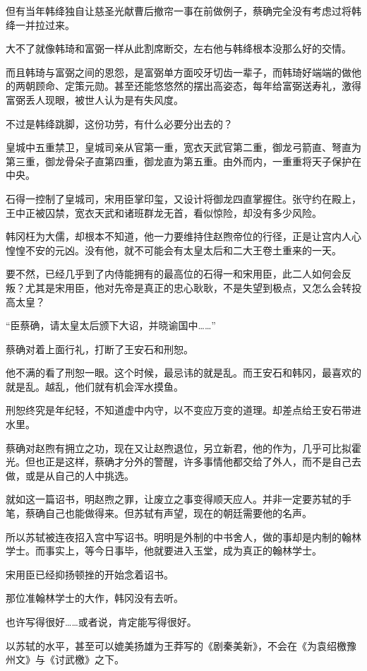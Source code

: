 但有当年韩绛独自让慈圣光献曹后撤帘一事在前做例子，蔡确完全没有考虑过将韩绛一并拉过来。

大不了就像韩琦和富弼一样从此割席断交，左右他与韩绛根本没那么好的交情。

而且韩琦与富弼之间的恩怨，是富弼单方面咬牙切齿一辈子，而韩琦好端端的做他的两朝顾命、定策元勋。甚至还能悠悠然的摆出高姿态，每年给富弼送寿礼，激得富弼丢人现眼，被世人认为是有失风度。

不过是韩绛跳脚，这份功劳，有什么必要分出去的？

皇城中五重禁卫，皇城司亲从官第一重，宽衣天武官第二重，御龙弓箭直、弩直为第三重，御龙骨朵子直第四重，御龙直为第五重。由外而内，一重重将天子保护在中央。

石得一控制了皇城司，宋用臣掌印玺，又设计将御龙四直掌握住。张守约在殿上，王中正被囚禁，宽衣天武和诸班群龙无首，看似惊险，却没有多少风险。

韩冈枉为大儒，却根本不知道，他一力要维持住赵煦帝位的行径，正是让宫内人心惶惶不安的元凶。没有他，就不可能会有太皇太后和二大王卷土重来的一天。

要不然，已经几乎到了内侍能拥有的最高位的石得一和宋用臣，此二人如何会反叛？尤其是宋用臣，他对先帝是真正的忠心耿耿，不是失望到极点，又怎么会转投高太皇？

“臣蔡确，请太皇太后颁下大诏，并晓谕国中……”

蔡确对着上面行礼，打断了王安石和刑恕。

他不满的看了刑恕一眼。这个时候，最忌讳的就是乱。而王安石和韩冈，最喜欢的就是乱。越乱，他们就有机会浑水摸鱼。

刑恕终究是年纪轻，不知道虚中内守，以不变应万变的道理。却差点给王安石带进水里。

蔡确对赵煦有拥立之功，现在又让赵煦退位，另立新君，他的作为，几乎可比拟霍光。但也正是这样，蔡确才分外的警醒，许多事情他都交给了外人，而不是自己去做，或是从自己的人中挑选。

就如这一篇诏书，明赵煦之罪，让废立之事变得顺天应人。并非一定要苏轼的手笔，蔡确自己也能做得来。但苏轼有声望，现在的朝廷需要他的名声。

所以苏轼被连夜招入宫中写诏书。明明是外制的中书舍人，做的事却是内制的翰林学士。而事实上，等今日事毕，他就要进入玉堂，成为真正的翰林学士。

宋用臣已经抑扬顿挫的开始念着诏书。

那位准翰林学士的大作，韩冈没有去听。

也许写得很好……或者说，肯定能写得很好。

以苏轼的水平，甚至可以媲美扬雄为王莽写的《剧秦美新》，不会在《为袁绍檄豫州文》与《讨武檄》之下。

